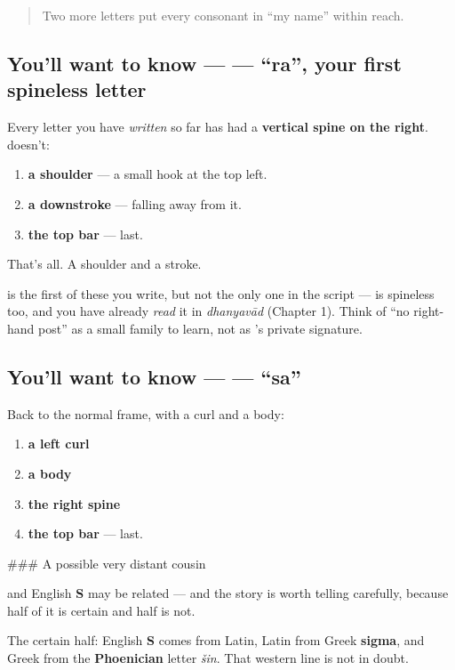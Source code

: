 \begin{quote}
Two more letters put every consonant in \textquotedblleft{}my name\textquotedblright{} within reach.
\end{quote}

\subsection*{You'll want to know —  — \textquotedblleft{}ra\textquotedblright{}, your first spineless letter}
Every letter you have \emph{written} so far has had a \textbf{vertical spine on the right}.  doesn't:

\begin{enumerate}
\raggedright
  \item \textbf{a shoulder} — a small hook at the top left.
  \item \textbf{a downstroke} — falling away from it.
  \item \textbf{the top bar} — last.
\end{enumerate}

That's all. A shoulder and a stroke.

 is the first of these you write, but not the only one in the script — \textbf{} is spineless too, and you have already \emph{read} it in \emph{dhanyavād} (Chapter 1). Think of \textquotedblleft{}no right-hand post\textquotedblright{} as a small family to learn, not as 's private signature.

\subsection*{You'll want to know —  — \textquotedblleft{}sa\textquotedblright{}}
Back to the normal frame, with a curl and a body:

\begin{enumerate}
\raggedright
  \item \textbf{a left curl}
  \item \textbf{a body}
  \item \textbf{the right spine}
  \item \textbf{the top bar} — last.
\end{enumerate}

\#\#\# A possible very distant cousin

\textbf{} and English \textbf{S} may be related — and the story is worth telling carefully, because half of it is certain and half is not.

The certain half: English \textbf{S} comes from Latin, Latin from Greek \textbf{sigma}, and Greek from the \textbf{Phoenician} letter \emph{šin}. That western line is not in doubt.

